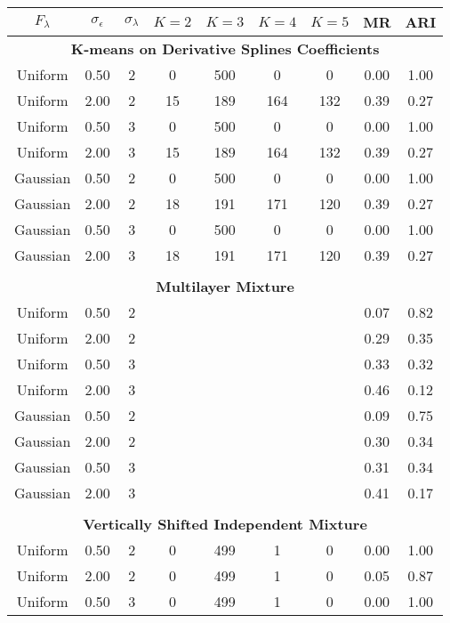 \begin{table}[ht]
\begin{center}
\begin{tabular}{ccc|cccccc}
  \thickhline$F_{\lambda}$&$\sigma_{\epsilon}$&$\sigma_{\lambda}$&$K=2$&$K=3$&$K=4$&$K=5$&MR&ARI\\ \hline\multicolumn{9}{c}{\textbf{K-means on Derivative Splines Coefficients}}\\ Uniform & 0.50 &   2 & 0 & 500 & 0 & 0 & 0.00 & 1.00 \\ 
  Uniform & 2.00 &   2 & 15 & 189 & 164 & 132 & 0.39 & 0.27 \\ 
  Uniform & 0.50 &   3 & 0 & 500 & 0 & 0 & 0.00 & 1.00 \\ 
  Uniform & 2.00 &   3 & 15 & 189 & 164 & 132 & 0.39 & 0.27 \\ 
  Gaussian & 0.50 &   2 & 0 & 500 & 0 & 0 & 0.00 & 1.00 \\ 
  Gaussian & 2.00 &   2 & 18 & 191 & 171 & 120 & 0.39 & 0.27 \\ 
  Gaussian & 0.50 &   3 & 0 & 500 & 0 & 0 & 0.00 & 1.00 \\ 
  Gaussian & 2.00 &   3 & 18 & 191 & 171 & 120 & 0.39 & 0.27 \\ 
   \\ \multicolumn{9}{c}{\textbf{Multilayer Mixture}}\\Uniform & 0.50 &   2 &  &  &  &  & 0.07 & 0.82 \\ 
  Uniform & 2.00 &   2 &  &  &  &  & 0.29 & 0.35 \\ 
  Uniform & 0.50 &   3 &  &  &  &  & 0.33 & 0.32 \\ 
  Uniform & 2.00 &   3 &  &  &  &  & 0.46 & 0.12 \\ 
  Gaussian & 0.50 &   2 &  &  &  &  & 0.09 & 0.75 \\ 
  Gaussian & 2.00 &   2 &  &  &  &  & 0.30 & 0.34 \\ 
  Gaussian & 0.50 &   3 &  &  &  &  & 0.31 & 0.34 \\ 
  Gaussian & 2.00 &   3 &  &  &  &  & 0.41 & 0.17 \\ 
   \\ \multicolumn{9}{c}{\textbf{Vertically Shifted Independent Mixture}}\\Uniform & 0.50 &   2 & 0 & 499 & 1 & 0 & 0.00 & 1.00 \\ 
  Uniform & 2.00 &   2 & 0 & 499 & 1 & 0 & 0.05 & 0.87 \\ 
  Uniform & 0.50 &   3 & 0 & 499 & 1 & 0 & 0.00 & 1.00 \\ 

\end{tabular}
\end{center}
\end{table}
